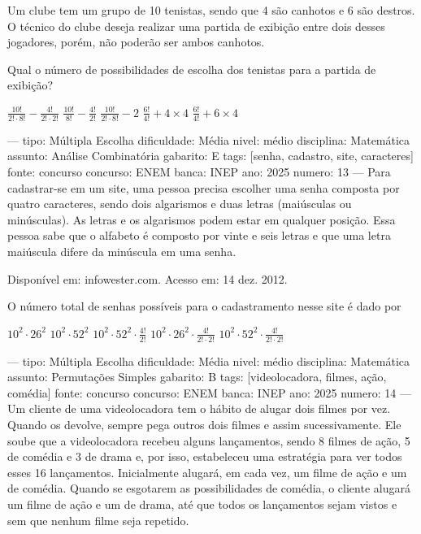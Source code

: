 Um clube tem um grupo de 10 tenistas, sendo que 4 são canhotos e 6 são destros. O técnico do clube deseja realizar uma partida de exibição entre dois desses jogadores, porém, não poderão ser ambos canhotos.

Qual o número de possibilidades de escolha dos tenistas para a partida de exibição?
\begin{choices}
\CorrectChoice \( \frac{10!}{2! \cdot 8!} - \frac{4!}{2! \cdot 2!} \)
\choice \( \frac{10!}{8!} - \frac{4!}{2!} \)
\choice \( \frac{10!}{2! \cdot 8!} - 2 \)
\choice \( \frac{6!}{4!} + 4 \times 4 \)
\choice \( \frac{6!}{4!} + 6 \times 4 \)
\end{choices}

---
tipo: Múltipla Escolha
dificuldade: Média
nivel: médio
disciplina: Matemática
assunto: Análise Combinatória
gabarito: E
tags: [senha, cadastro, site, caracteres]
fonte: concurso
concurso: ENEM
banca: INEP
ano: 2025
numero: 13
---
\question
Para cadastrar-se em um site, uma pessoa precisa escolher uma senha composta por quatro caracteres, sendo dois algarismos e duas letras (maiúsculas ou minúsculas). As letras e os algarismos podem estar em qualquer posição. Essa pessoa sabe que o alfabeto é composto por vinte e seis letras e que uma letra maiúscula difere da minúscula em uma senha.

Disponível em: infowester.com. Acesso em: 14 dez. 2012.

O número total de senhas possíveis para o cadastramento nesse site é dado por
\begin{choices}
\choice \( 10^2 \cdot 26^2 \)
\choice \( 10^2 \cdot 52^2 \)
\choice \( 10^2 \cdot 52^2 \cdot \frac{4!}{2!} \)
\choice \( 10^2 \cdot 26^2 \cdot \frac{4!}{2! \cdot 2!} \)
\CorrectChoice \( 10^2 \cdot 52^2 \cdot \frac{4!}{2! \cdot 2!} \)
\end{choices}

---
tipo: Múltipla Escolha
dificuldade: Média
nivel: médio
disciplina: Matemática
assunto: Permutações Simples
gabarito: B
tags: [videolocadora, filmes, ação, comédia]
fonte: concurso
concurso: ENEM
banca: INEP
ano: 2025
numero: 14
---
\question
Um cliente de uma videolocadora tem o hábito de alugar dois filmes por vez. Quando os devolve, sempre pega outros dois filmes e assim sucessivamente. Ele soube que a videolocadora recebeu alguns lançamentos, sendo 8 filmes de ação, 5 de comédia e 3 de drama e, por isso, estabeleceu uma estratégia para ver todos esses 16 lançamentos. Inicialmente alugará, em cada vez, um filme de ação e um de comédia. Quando se esgotarem as possibilidades de comédia, o cliente alugará um filme de ação e um de drama, até que todos os lançamentos sejam vistos e sem que nenhum filme seja repetido.

